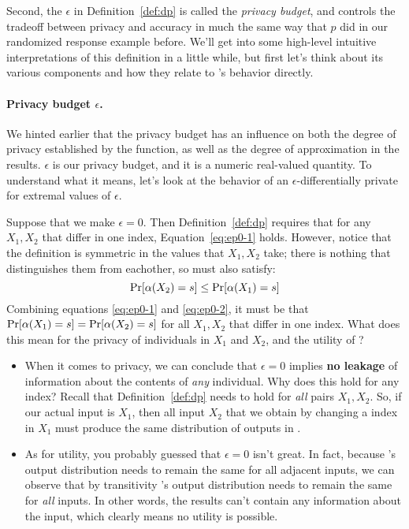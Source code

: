 \documentclass[11pt,twoside]{scrartcl}
\begin{document}
Second, the $\epsilon$ in Definition~\ref{def:dp} is called the \emph{privacy budget}, and controls the tradeoff between privacy and accuracy in much the same way that $p$ did in our randomized response example before. We'll get into some high-level intuitive interpretations of this definition in a little while, but first let's think about its various components and how they relate to \san's behavior directly.

\paragraph{Privacy budget $\epsilon$.} We hinted earlier that the privacy budget has an influence on both the degree of privacy established by the function, as well as the degree of approximation in the results. $\epsilon$ is our privacy budget, and it is a numeric real-valued quantity. To understand what it means, let's look at the behavior of an $\epsilon$-differentially private \san for extremal values of $\epsilon$.

Suppose that we make $\epsilon = 0$. Then Definition~\ref{def:dp} requires that for any $X_1, X_2$ that differ in one index, Equation~\ref{eq:ep0-1} holds. However, notice that the definition is symmetric in the values that $X_1, X_2$ take; there is nothing that distinguishes them from eachother, so \san must also satisfy:
\begin{equation}
\label{eq:ep0-2}
\mathrm{Pr}[\san(X_2) = s] \le \mathrm{Pr}[\san(X_1) = s]
\end{equation}
Combining equations \ref{eq:ep0-1} and \ref{eq:ep0-2}, it must be that $\mathrm{Pr}[\alpha(X_1) = s] = \mathrm{Pr}[\alpha(X_2) = s]$ for all $X_1, X_2$ that differ in one index. What does this mean for the privacy of individuals in $X_1$ and $X_2$, and the utility of \san?
\begin{itemize}
\item When it comes to privacy, we can conclude that $\epsilon=0$ implies \textbf{no leakage} of information about the contents of \emph{any} individual. Why does this hold for any index? Recall that Definition~\ref{def:dp} needs to hold for \emph{all} pairs $X_1,X_2$. So, if our actual input is $X_1$, then all input $X_2$ that we obtain by changing a index in $X_1$ must produce the same distribution of outputs in \san.

\item As for utility, you probably guessed that $\epsilon = 0$ isn't great. In fact, because \san's output distribution needs to remain the same for all adjacent inputs, we can observe that by transitivity \san's output distribution needs to remain the same for \emph{all} inputs. In other words, the results can't contain any information about the input, which clearly means no utility is possible.
\end{itemize}
\end{document}
